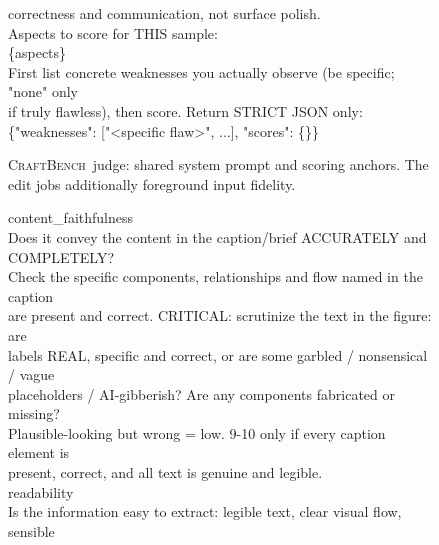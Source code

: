 \documentclass{llmxive}
\providecommand{\CrafterBench}{\textsc{CraftBench}\xspace}
\begin{document}
\begin{figure}[t]
\begin{tcolorbox}
correctness and communication, not surface polish. \\[5pt]
Aspects to score for THIS sample: \\
\{aspects\} \\[5pt]
First list concrete weaknesses you actually observe (be specific; "none" only \\
if truly flawless), then score. Return STRICT JSON only: \\
\{"weaknesses": ["<specific flaw>", ...], "scores": \{<aspect keys>\}\}
\end{tcolorbox}
\caption{\CrafterBench\ judge: shared system prompt and scoring anchors. The edit jobs additionally foreground input fidelity.}
\label{fig:prompt-judge-system}
\end{figure}

\begin{figure}[t]
\centering
\begin{tcolorbox}[title={Aspect definitions filling the $\{$aspects$\}$ slot. Text-to-image uses content\_faithfulness, readability, and one format aspect, while the edit tasks use content\_faithfulness, readability, and input\_fidelity.}, width=\textwidth, colback=gray!5, colframe=black, fonttitle=\bfseries]
\small
content\_faithfulness \\
\hspace*{1.0em}Does it convey the content in the caption/brief ACCURATELY and COMPLETELY? \\
\hspace*{1.0em}Check the specific components, relationships and flow named in the caption \\
\hspace*{1.0em}are present and correct. CRITICAL: scrutinize the text in the figure: are \\
\hspace*{1.0em}labels REAL, specific and correct, or are some garbled / nonsensical / vague \\
\hspace*{1.0em}placeholders / AI-gibberish? Are any components fabricated or missing? \\
\hspace*{1.0em}Plausible-looking but wrong = low. 9-10 only if every caption element is \\
\hspace*{1.0em}present, correct, and all text is genuine and legible. \\[5pt]
readability \\
\hspace*{1.0em}Is the information easy to extract: legible text, clear visual flow, sensible \\

\end{tcolorbox}
\end{figure}
\end{document}
